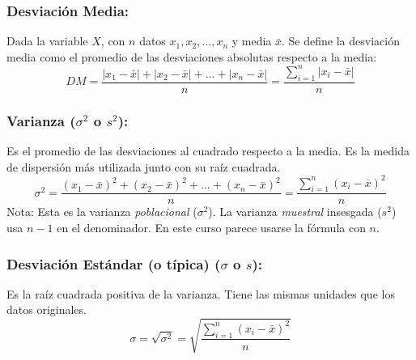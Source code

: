 \documentclass[12pt, letterpaper]{article}
\begin{document}
\subsubsection{Desviación Media:}
Dada la variable $X$, con $n$ datos $x_1, x_2, \dots, x_n$ y media $\bar{x}$. Se define la desviación media como el promedio de las desviaciones absolutas respecto a la media:
\[ DM = \frac{|x_1-\bar{x}|+|x_2-\bar{x}|+\dots+|x_n-\bar{x}|}{n} = \frac{\sum_{i=1}^{n} |x_i - \bar{x}|}{n} \] %

\subsubsection{Varianza ($\sigma^2$ o $s^2$):} %
Es el promedio de las desviaciones al cuadrado respecto a la media. Es la medida de dispersión más utilizada junto con su raíz cuadrada.
\[ \sigma^2 = \frac{(x_1-\bar{x})^2+(x_2-\bar{x})^2+\dots+(x_n-\bar{x})^2}{n} = \frac{\sum_{i=1}^{n} (x_i - \bar{x})^2}{n} \]
Nota: Esta es la varianza \textit{poblacional} ($\sigma^2$). La varianza \textit{muestral} insesgada ($s^2$) usa $n-1$ en el denominador. En este curso parece usarse la fórmula con $n$. %

\subsubsection{Desviación Estándar (o típica) ($\sigma$ o $s$):}
Es la raíz cuadrada positiva de la varianza. Tiene las mismas unidades que los datos originales.
\[ \sigma = \sqrt{\sigma^2} = \sqrt{\frac{\sum_{i=1}^{n} (x_i - \bar{x})^2}{n}} \] %
\end{document}
